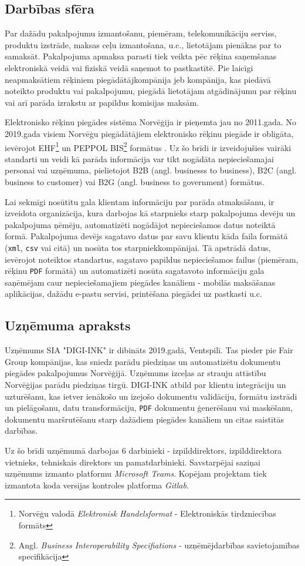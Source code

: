 \subsection{Darbības sfēra}
\par Par dažādu pakalpojumu izmantošanu, piemēram, telekomunikāciju serviss, produktu izstrāde, maksas ceļu izmantošana, u.c., lietotājam pienākas par to samaksāt. Pakalpojuma apmaksa parasti tiek veikta pēc rēķina saņemšanas elektroniskā veidā vai fiziskā veidā saņemot to pastkastītē. Pie laicīgi neapmaksātiem rēķiniem piegādātājkompānija jeb kompānija, kas piedāvā noteikto produktu vai pakalpojumu, piegādā lietotājam atgādinājumu par rēķinu vai arī parāda izrakstu ar papildus komisijas maksām.
\par Elektronisko rēķinu piegādes sistēma Norvēģija ir pieņemta jau no 2011.gada. No 2019.gada visiem Norvēģu piegādātājiem elektronisko rēķinu piegāde ir obligāta, ievērojot EHF\footnote{Norvēģu valodā \textit{Elektronisk Handelsformat} - Elektroniskās tirdzniecības formāts} un PEPPOL BIS\footnote{Angl. \textit{Business Interoperability Specifiations} - uzņēmējdarbības savietojamības specifikācija} formātus \cite{eInvoicingNorway}. Uz šo brīdi ir izveidojušies vairāki standarti un veidi kā parāda informācija var tikt nogādāta nepieciešamajai personai vai uzņēmuma, pielietojot B2B (angl. businesss to business), B2C (angl. business to customer) vai B2G (angl. business to government) formātus.
\par Lai sekmīgi nosūtītu gala klientam informāciju par parāda atmaksāšanu, ir izveidota organizācija, kura darbojas kā starpnieks starp pakalpojuma devēju un pakalpojuma ņēmēju, automatizēti nogādājot nepieciešamos datus noteiktā formā. Pakalpojuma devējs sagatavo datus par savu klientu kāda faila formātā (\texttt{xml}, \texttt{csv} vai citā) un nosūta tos starpniekkompānijai. Tā apstrādā datus, ievērojot noteiktos standartus, sagatavo papildus nepieciešamos failus (piemēram, rēķinu \texttt{PDF} formātā) un automatizēti nosūta sagatavoto informāciju gala saņēmējam caur nepieciešamajiem piegādes kanāliem - mobilās maksāšanas aplikācijas, dažādu e-pastu servisi, printēšana piegādei uz pastkasti u.c.
\subsection{Uzņēmuma apraksts}
Uzņēmums SIA "DIGI-INK" ir dibināts 2019.gadā, Ventspilī. Tas pieder pie Fair Group kompānijas, kas sniedz parādu piedziņas un automatizētu dokumentu piegādes pakalpojumus Norvēģijā. Uzņēmums izceļas ar strauju attīstību Norvēģijas parādu piedziņas tirgū.
DIGI-INK atbild par klientu integrāciju un uzturēšanu, kas ietver ienākošo un izejošo dokumentu validāciju, formātu izstrādi un pielāgošanu, datu transformāciju, \texttt{PDF} dokumentu ģenerēšanu vai maskēšanu, dokumentu maršrutēšanu starp dažādiem piegādes kanāliem un citas saistītās darbības.
\par Uz šo brīdi uzņēmumā darbojas 6 darbinieki - izpilddirektors, izpilddirektora vietnieks, tehniskais direktors un pamatdarbinieki. Savstarpējai saziņai uzņēmums izmanto platformu \textit{Microsoft Teams}. Kopējam projektam tiek izmantota koda versijas kontroles platforma \textit{Gitlab}.

